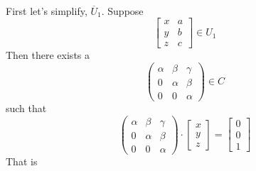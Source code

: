\begin{example}
\bigskip
\\
First let's simplify, $\overline{U}_1$. Suppose
\[
	\begin{bmatrix}
	x&a\\
	y&b\\
	z&c
	\end{bmatrix}
	\in U_1
\]
Then there exists a 
\[
	\begin{pmatrix}
		\alpha & \beta & \gamma \\
		0 & \alpha & \beta \\
		0 & 0 & \alpha	
	\end{pmatrix}
	\in
	C
\]
such that
\[
	\begin{pmatrix}
		\alpha & \beta & \gamma \\
		0 & \alpha & \beta \\
		0 & 0 & \alpha	
	\end{pmatrix}
	\cdot
	\begin{bmatrix}
		x\\
		y\\
		z
	\end{bmatrix}
	=
	\begin{bmatrix}
		0\\
		0\\
		1
	\end{bmatrix}	
\] 
That is 


\end{example}
